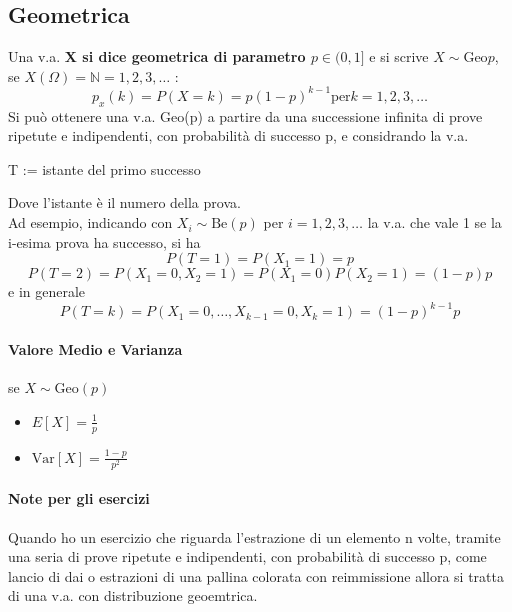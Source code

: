 \subsection*{Geometrica}
Una v.a. \textbf{X si dice geometrica di parametro $p \in (0,1]$} e si scrive 
\textbf{$X \sim \text{Geo}p$}, se \textbf{$X(\Omega)=\mathbb{N} = {1,2,3,\dots}$} :
\begin{equation*}
    p_x (k) = P(X = k) = p(1-p)^{k-1} \text{per} k=1,2,3,\dots
\end{equation*}
Si può ottenere una v.a. Geo(p) a partire da una successione infinita di prove ripetute
e indipendenti, con probabilità di successo p, e considrando la v.a.
\begin{center}
    T := istante del primo successo
\end{center}
Dove l'istante è il numero della prova.
\\ Ad esempio, indicando con $X_i \sim \text{Be}(p)$ per $i=1,2,3,\dots$ la v.a. che vale 1
se la i-esima prova ha successo, si ha
\begin{equation*}
    P(T=1) = P(X_1 = 1) = p
\end{equation*}
\begin{equation*}
    P(T=2) = P(X_1 = 0, X_2 = 1) = P(X_1 = 0)P(X_2 = 1) = (1-p)p
\end{equation*}
e in generale
\begin{equation*}
    P(T=k) = P(X_1=0, \dots, X_{k-1} = 0, X_k = 1) = (1-p)^{k-1}p
\end{equation*}
\paragraph*{Valore Medio e Varianza} se $X\sim \text{Geo}(p)$
\begin{itemize}
    \item $E[X] = \frac{1}{p}$
    \item $\text{Var}[X] = \frac{1-p}{p^2}$
\end{itemize}
\paragraph*{Note per gli esercizi}
Quando ho un esercizio che riguarda l'estrazione di un elemento n volte, tramite una seria
di prove ripetute e indipendenti, con probabilità di successo p, come lancio di dai o
estrazioni di una pallina colorata con reimmissione allora si tratta di una v.a. con
distribuzione geoemtrica.

